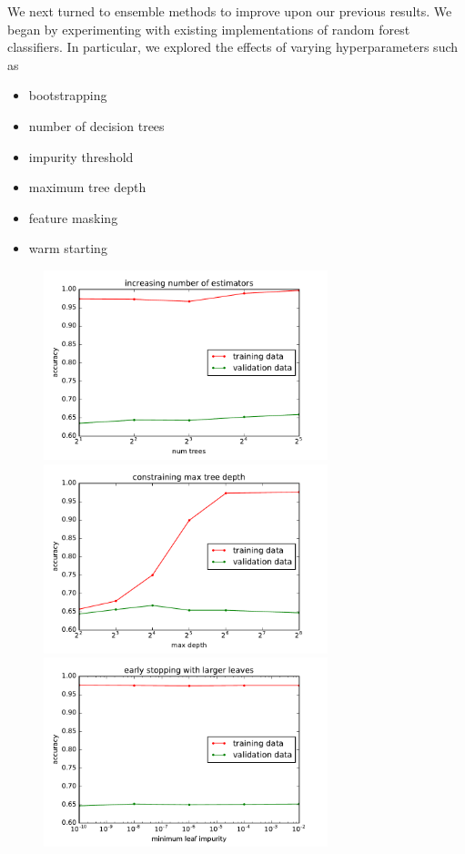 \documentclass{article}
\begin{document}
\begin{multicols}{2}
We next turned to ensemble methods
to improve upon our previous results.
We began by experimenting with
existing implementations of random forest classifiers.
In particular,
we explored the effects of varying hyperparameters such as
\begin{itemize}
    \item
    bootstrapping
    \item
    number of decision trees
    \item
    impurity threshold
    \item
    maximum tree depth
    \item
    feature masking
    \item
    warm starting
\end{itemize}

\begin{figure}[t]
   \centering
   \includegraphics[width=3.25in]{img/rf-numEstimators.pdf}\hspace{-.1in}
   \includegraphics[width=3.25in]{img/rf-maxTreeDepth.pdf}
   \includegraphics[width=3.25in]{img/rf-impurity.pdf}\hspace{-.1in}

\end{figure}
\end{multicols}
\end{document}
